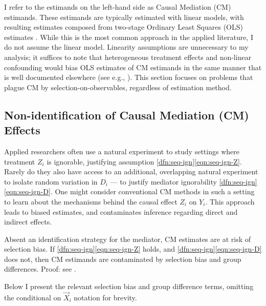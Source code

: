 I refer to the estimands on the left-hand side as Causal Mediation (CM) estimands.
These estimands are typically estimated with linear models, with resulting estimates composed from two-stage Ordinary Least Squares (OLS) estimates \citep{imai2010identification}.
While this is the most common approach in the applied literature, I do not assume the linear model.
Linearity assumptions are unnecessary to my analysis; it suffices to note that heterogeneous treatment effects and non-linear confounding would bias OLS estimates of CM estimands in the same manner that is well documented elsewhere (see e.g., \citealt{angrist1998estimating,sloczynski2022interpreting}).
This section focuses on problems that plague CM by selection-on-observables, regardless of estimation method.

\subsection{Non-identification of Causal Mediation (CM) Effects}
Applied researchers often use a natural experiment to study settings where treatment $Z_i$ is ignorable, justifying assumption \ref{dfn:seq-ign}\eqref{eqn:seq-ign-Z}.
Rarely do they also have access to an additional, overlapping natural experiment to isolate random variation in $D_i$ --- to justify mediator ignorability \ref{dfn:seq-ign}\eqref{eqn:seq-ign-D}.
One might consider conventional CM methods in such a setting to learn about the mechanisms behind the causal effect $Z_i$ on $Y_i$.
This approach leads to biased estimates, and contaminates inference regarding direct and indirect effects.

\begin{theorem}
    \label{thm:selection-bias}
    Absent an identification strategy for the mediator, CM estimates are at risk of selection bias.
    If \ref{dfn:seq-ign}\eqref{eqn:seq-ign-Z} holds, and \ref{dfn:seq-ign}\eqref{eqn:seq-ign-D} does not, then CM estimands are contaminated by selection bias and group differences.
    Proof: see .
\end{theorem}
Below I present the relevant selection bias and group difference terms, omitting the conditional on $\vec X_i$ notation for brevity.

